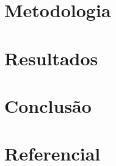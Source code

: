 \documentclass[12pt,english, french, spanish, brazil,a4paper,twoside, openright]{abntex2}	%
\begin{document}
\hypertarget{metodologia}{%
\section{Metodologia}\label{metodologia}}

\hypertarget{resultados}{%
\section{Resultados}\label{resultados}}

\hypertarget{conclusuxe3o}{%
\section{Conclusão}\label{conclusuxe3o}}

\hypertarget{referencial}{%
\section{Referencial}\label{referencial}}	%



\printbibliography
\end{document}
